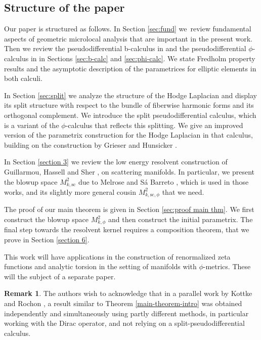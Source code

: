 \documentclass[11pt]{article}
\numberwithin{equation}{section}
\theoremstyle{plain}
\theoremstyle{definition}
\newtheorem{Rem}[Th]{Remark}
\newcommand{\ssc}{{\mathrm{sc}}}
\begin{document}
\subsection{Structure of the paper}
Our paper is structured as follows. In Section \ref{sec:fund} we~review fundamental
aspects of geometric microlocal analysis that are important in the
present work. Then we review the pseudodifferential b-calculus in \cite{melrose1993atiyah}
and the pseudodifferential $\phi$-calculus in \cite{mazzeo1998pseudodifferential} in Sections \ref{sec:b-calc} and \ref{sec:phi-calc}.
We state Fredholm property results and the asymptotic description of the parametrices
for elliptic elements in both calculi.

In Section \ref{sec:split} we analyze the structure of the Hodge Laplacian and display its split structure with respect to the bundle of fiberwise harmonic forms and its orthogonal complement. We introduce the split pseudodifferential calculus, which is a variant of the $\phi$-calculus that reflects this splitting. We give an improved version of the parametrix construction for the Hodge Laplacian in that calculus, building on the construction by
Grieser and Hunsicker \cite{grieser-para}.

In Section \ref{section 3} we review the low energy resolvent construction of Guillarmou, Hassell and Sher \cite{guillarmou2008resolvent}, \cite{guillarmou2014low} on scattering manifolds. In particular, we present the blowup space $M^2_{k,\ssc}$
due to Melrose and S{\'a} Barreto \cite{melrosesabarreto}, which is used in those works, and its slightly more general cousin $M^2_{k,\ssc,\phi}$ that we need.

The proof of our main theorem is given in Section \ref{sec:proof main thm}.
We first construct the blowup space $M^2_{k,\phi}$ and then construct the initial parametrix. The final step towards the resolvent kernel requires a composition theorem, that we prove in Section \ref{section 6}.

This work will have applications in the construction of renormalized zeta functions
and analytic torsion
in the setting of manifolds with $\phi$-metrics. These will the subject of a separate paper.

\begin{Rem}
The authors wish to acknowledge that in a parallel work by Kottke and Rochon \cite{kottke-rochon},
a result similar to Theorem \ref{main-theorem-intro} was obtained independently and simultaneously
using partly different methods, in particular working with the Dirac operator, and not
relying on a split-pseudodifferential calculus. \end{Rem}
\end{document}
